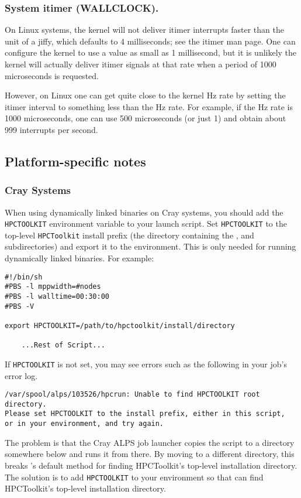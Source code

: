 \documentclass[english]{article}
\begin{document}
\subsubsection{System itimer (WALLCLOCK).}
On Linux systems, the kernel will not deliver itimer interrupts faster than the unit of a jiffy, which defaults to 4 milliseconds; see the itimer man page.
One can configure the kernel to use a value as small as 1 millisecond, but it is unlikely the kernel will actually deliver itimer signals at that rate when a period of 1000 microseconds is requested.

However, on Linux one can get quite close to the kernel Hz rate by setting the itimer interval to something less than the Hz rate.
For example, if the Hz rate is 1000 microseconds, one can use 500 microseconds (or just 1) and obtain about 999 interrupts per second.

\subsection{Platform-specific notes}
\subsubsection{Cray Systems}
When using dynamically linked binaries on Cray systems, you
should add the \verb+HPCTOOLKIT+ environment variable to your launch
script.  Set \verb+HPCTOOLKIT+ to the top-level \verb+HPCToolkit+ install
prefix (the directory containing the ,  and
 subdirectories) and export it to the environment.  This is
only needed for running dynamically linked binaries.  For example:

\begin{verbatim}
#!/bin/sh
#PBS -l mppwidth=#nodes
#PBS -l walltime=00:30:00
#PBS -V

export HPCTOOLKIT=/path/to/hpctoolkit/install/directory

    ...Rest of Script...
\end{verbatim}

If \verb+HPCTOOLKIT+ is not set, you may see errors such as the
following in your job's error log.

\begin{verbatim}
/var/spool/alps/103526/hpcrun: Unable to find HPCTOOLKIT root directory.
Please set HPCTOOLKIT to the install prefix, either in this script,
or in your environment, and try again.
\end{verbatim}

The problem is that the Cray ALPS job launcher copies the 
script to a directory somewhere below  and runs
it from there.  By moving  to a different directory, this
breaks 's default method for finding HPCToolkit's top-level
installation directory.
The solution is to add \verb+HPCTOOLKIT+ to your environment so that
 can find HPCToolkit's top-level installation directory.
\end{document}

